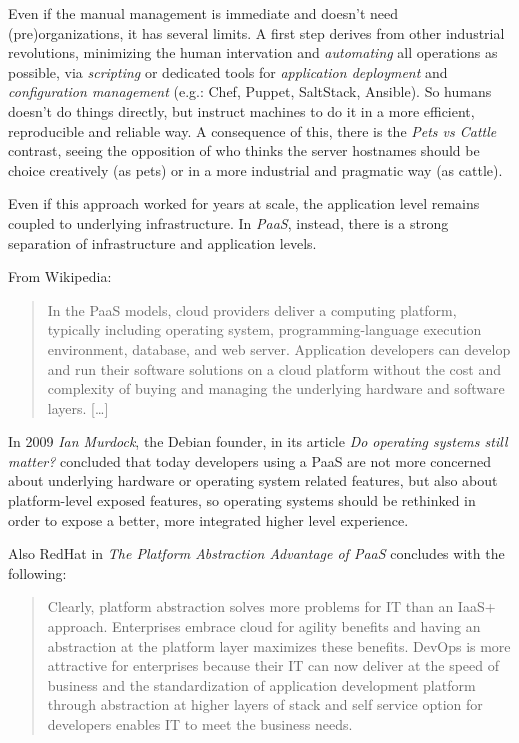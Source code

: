 Even if the manual management is immediate and doesn't need
(pre)organizations, it has several limits. A first step derives from
other industrial revolutions, minimizing the human intervation and
\emph{automating} all operations as possible, via \emph{scripting} or
dedicated tools for \emph{application deployment} and
\emph{configuration management} (e.g.: Chef, Puppet, SaltStack,
Ansible). So humans doesn't do things directly, but instruct machines to
do it in a more efficient, reproducible and reliable way. A consequence
of this, there is the \emph{Pets vs Cattle} contrast, seeing the
opposition of who thinks the server hostnames should be choice
creatively (as pets) or in a more industrial and pragmatic way (as
cattle).

Even if this approach worked for years at scale, the application level
remains coupled to underlying infrastructure. In \emph{PaaS}, instead,
there is a strong separation of infrastructure and application levels.

From Wikipedia:

\begin{quote}
In the PaaS models, cloud providers deliver a computing platform,
typically including operating system, programming-language execution
environment, database, and web server. Application developers can
develop and run their software solutions on a cloud platform without the
cost and complexity of buying and managing the underlying hardware and
software layers. {[}\ldots{}{]}
\end{quote}

In 2009 \emph{Ian Murdock}, the Debian founder, in its article \emph{Do
operating systems still matter?}\cite{DoOperatingSystemsStillMatter}
concluded that today developers using a PaaS are not more concerned
about underlying hardware or operating system related features, but also
about platform-level exposed features, so operating systems should be
rethinked in order to expose a better, more integrated higher level
experience.

Also RedHat in \emph{The Platform Abstraction Advantage of
PaaS}\cite{ThePlatformAbstractionAdvantageOfPaaS} concludes with the
following:

\begin{quote}
Clearly, platform abstraction solves more problems for IT than an IaaS+
approach. Enterprises embrace cloud for agility benefits and having an
abstraction at the platform layer maximizes these benefits. DevOps is
more attractive for enterprises because their IT can now deliver at the
speed of business and the standardization of application development
platform through abstraction at higher layers of stack and self service
option for developers enables IT to meet the business needs.
\end{quote}

